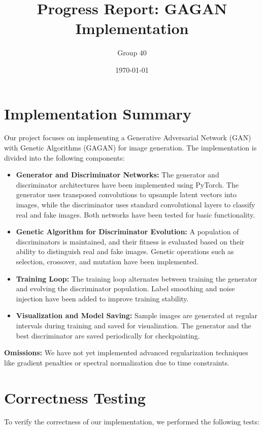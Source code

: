 \documentclass[12pt]{article}
\title{Progress Report: GAGAN Implementation}
\author{Group 40}
\date{\today}
\begin{document}
\maketitle

\section*{Implementation Summary}
Our project focuses on implementing a Generative Adversarial Network (GAN) with Genetic Algorithms (GAGAN) for image generation. The implementation is divided into the following components:

\begin{itemize}
    \item \textbf{Generator and Discriminator Networks:}  
    The generator and discriminator architectures have been implemented using PyTorch. The generator uses transposed convolutions to upsample latent vectors into images, while the discriminator uses standard convolutional layers to classify real and fake images. Both networks have been tested for basic functionality.

    \item \textbf{Genetic Algorithm for Discriminator Evolution:}  
    A population of discriminators is maintained, and their fitness is evaluated based on their ability to distinguish real and fake images. Genetic operations such as selection, crossover, and mutation have been implemented.

    \item \textbf{Training Loop:}  
    The training loop alternates between training the generator and evolving the discriminator population. Label smoothing and noise injection have been added to improve training stability.

    \item \textbf{Visualization and Model Saving:}  
    Sample images are generated at regular intervals during training and saved for visualization. The generator and the best discriminator are saved periodically for checkpointing.
\end{itemize}

\textbf{Omissions:}  
We have not yet implemented advanced regularization techniques like gradient penalties or spectral normalization due to time constraints.

\section*{Correctness Testing}
To verify the correctness of our implementation, we performed the following tests:
\end{document}
